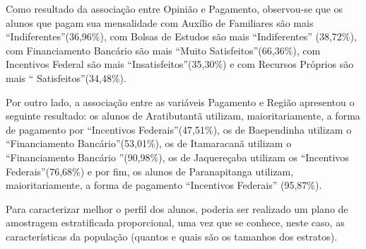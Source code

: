 	Como resultado da associação entre Opinião e Pagamento, observou-se que
	os alunos que pagam sua mensalidade com Auxílio de Familiares são mais
	\textquotedblleft Indiferentes\textquotedblright (36,96\%), com Bolsas
	de Estudos são mais \textquotedblleft Indiferentes\textquotedblright
	(38,72\%), com Financiamento Bancário são mais \textquotedblleft Muito
	Satisfeitos\textquotedblright (66,36\%), com Incentivos Federal são mais
	\textquotedblleft Insatisfeitos\textquotedblright (35,30\%) e com
	Recursos Próprios são mais \textquotedblleft
	Satisfeitos\textquotedblright (34,48\%).

	Por outro lado, a associação entre as variáveis Pagamento e Região
	apresentou o seguinte resultado: os alunos de Aratibutantã utilizam,
	maioritariamente, a forma de pagamento por \textquotedblleft Incentivos
	Federais\textquotedblright (47,51\%), os de Baependinha utilizam o
	\textquotedblleft Financiamento Bancário\textquotedblright (53,01\%), os
	de Itamaracanã utilizam o \textquotedblleft Financiamento Bancário
	\textquotedblright (90,98\%), os de Jaquereçaba utilizam os
	\textquotedblleft Incentivos Federais\textquotedblright (76,68\%) e por
	fim, os alunos de Paranapitanga utilizam, maioritariamente, a forma de
	pagamento \textquotedblleft Incentivos Federais\textquotedblright
	(95,87\%). 

	Para caracterizar melhor o perfil dos alunos, poderia ser realizado um
	plano de amostragem estratificada proporcional, uma vez que se conhece,
	neste caso, as características da população (quantos e quais são os
	tamanhos dos estratos). 
